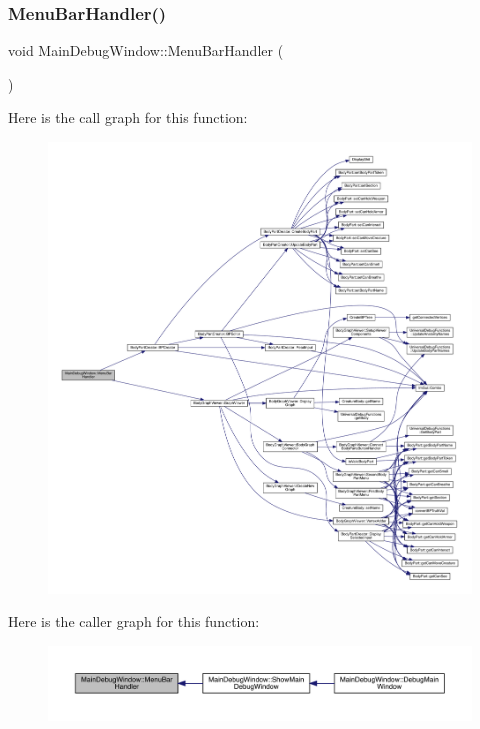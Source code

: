 \subsubsection{\texorpdfstring{Menu\+Bar\+Handler()}{MenuBarHandler()}}
{\footnotesize\ttfamily void Main\+Debug\+Window\+::\+Menu\+Bar\+Handler (\begin{DoxyParamCaption}{ }\end{DoxyParamCaption})}

Here is the call graph for this function\+:
\nopagebreak
\begin{figure}[H]
\begin{center}
\leavevmode
\includegraphics[width=350pt]{d9/dd7/namespace_main_debug_window_a2c9084a9752a2e4ef87b8ca3039f5a4d_cgraph}
\end{center}
\end{figure}
Here is the caller graph for this function\+:
\nopagebreak
\begin{figure}[H]
\begin{center}
\leavevmode
\includegraphics[width=350pt]{d9/dd7/namespace_main_debug_window_a2c9084a9752a2e4ef87b8ca3039f5a4d_icgraph}
\end{center}
\end{figure}
\mbox{\label{namespace_main_debug_window_ae0112f4e295169b45c2615b4915e3cc5}} 
